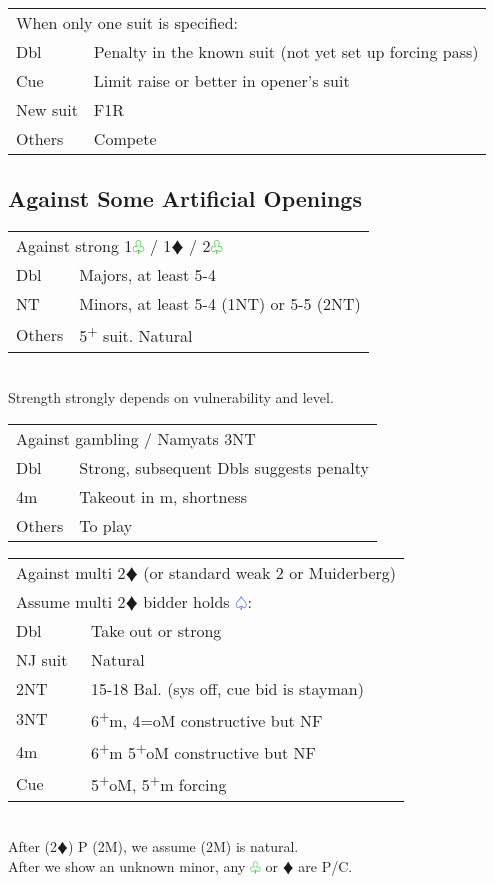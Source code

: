 \documentclass{article}
\renewcommand{\sp}{\textcolor{RoyalBlue}{$\varspade$}}
\newcommand{\di}{\textcolor{Peach}{$\vardiamond$}}
\newcommand{\cl}{\textcolor{LimeGreen}{$\varclub$}}
\newcommand{\nt}{\relsize{-1}NT\relsize{1}}
\newcommand{\up}{\textsuperscript{+}}
\begin{document}
\medskip

\begin{tabular}{|l|p{6.5cm}}
	\multicolumn{2}{l}{When only one suit is specified:} \\
    Dbl & Penalty in the known suit (not yet set up forcing pass) \\
    Cue & Limit raise or better in opener's suit \\
    New suit & F1R \\
    Others & Compete
\end{tabular}

\subsection{Against Some Artificial Openings}

\begin{tabular}{|l|p{6.5cm}}
	\multicolumn{2}{l}{Against strong 1\cl{} / 1\di{} / 2\cl{}} \\
    Dbl & Majors, at least 5-4 \\
    \nt & Minors, at least 5-4 (1\nt{}) or 5-5 (2\nt{}) \\
    Others & 5\up{} suit. Natural
\end{tabular}\\
Strength strongly depends on vulnerability and level. \\

\begin{tabular}{|l|p{6.5cm}}
	\multicolumn{2}{l}{Against gambling / Namyats 3\nt{}} \\
    Dbl & Strong, subsequent Dbls suggests penalty \\
    4m & Takeout in m, shortness \\
    Others & To play
\end{tabular}

\medskip

\begin{tabular}{|l|p{6.5cm}}
	\multicolumn{2}{l}{Against multi 2\di{} (or standard weak 2 or Muiderberg)} \\
	\multicolumn{2}{l}{Assume multi 2\di{} bidder holds \sp{}:} \\
    Dbl & Take out or strong \\
    NJ suit & Natural \\
    2\nt & 15-18 Bal. (sys off, cue bid is stayman) \\
    3\nt & 6\up{}m, 4=oM constructive but NF \\
    4m & 6\up{}m 5\up{}oM constructive but NF \\
    Cue & 5\up{}oM, 5\up{}m forcing \\
\end{tabular}\\
After (2\di{}) P (2M), we assume (2M) is natural. \\
After we show an unknown minor, any \cl{} or \di{} are P/C.
\end{document}
